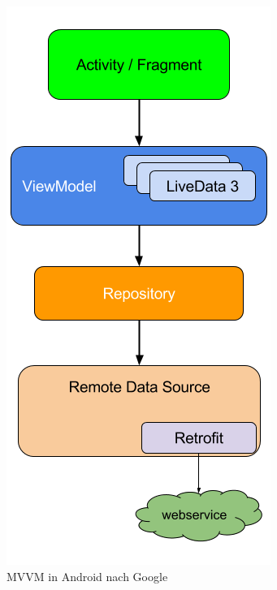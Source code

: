 \begin{figure}
  \includegraphics[width=\linewidth]{mvvm.png}
  \caption{MVVM in Android nach Google \cite{mvvm}}
  \label{fig:mvvm}
\end{figure}

